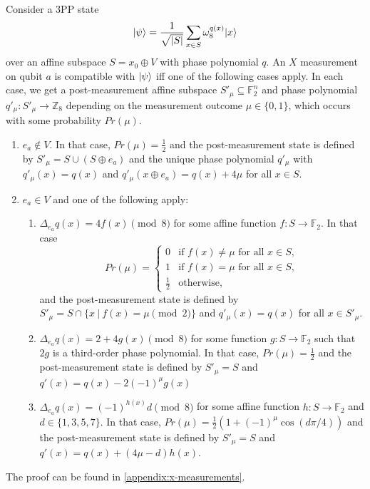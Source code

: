 \newcommand{\xMeasurementClassificationStatement}{%
    Consider a 3PP state
    \[ \ket{\psi} = \frac{1}{\sqrt{|S|}} \sum_{x\in S} \omega_8^{q(x)}\ket{x} \]
    over an affine subspace $S = x_0 \oplus V$ with phase polynomial $q$.
    An $X$ measurement on qubit $a$ is compatible with $\ket{\psi}$ iff one of the following cases apply.
    In each case, we get a post-measurement affine subspace $S'_\mu \subseteq \mathbb F_2^n$ and phase polynomial $q'_\mu: S'_\mu \to \mathbb Z_8$ depending on the measurement outcome $\mu \in \{0, 1\}$, which occurs with some probability $Pr(\mu)$.
    \begin{enumerate}
        \item $e_a \not\in V$. In that case, $Pr(\mu) = \frac{1}{2}$ and the post-measurement state is defined by $S'_\mu = S \cup (S \oplus e_a)$ and the unique phase polynomial $q'_\mu$ with $q'_\mu(x) = q(x)$ and $q'_\mu(x \oplus e_a) = q(x) + 4\mu$ for all $x \in S$.

        \item
        $e_a \in V$ and one of the following apply:
        \begin{enumerate}
            \item \label{thm:x-measurements:even-0-4}
            $\Delta_{e_a} q(x) = 4f(x) \pmod 8$ for some affine function $f: S \to \mathbb F_2$. In that case
            \[
                Pr(\mu) = \begin{cases}
                    0 & \text{if } f(x) \neq \mu \text{ for all } x \in S, \\
                    1 & \text{if } f(x) = \mu \text{ for all } x \in S, \\
                    \frac{1}{2} & \text{otherwise},
                \end{cases}
            \]
            and the post-measurement state is defined by $S'_\mu = S \cap \{ x ~|~ f(x) = \mu \pmod 2 \}$ and $q'_\mu(x) = q(x)$ for all $x \in S'_\mu$.

            \item \label{thm:x-measurements:even-2-6}
            $\Delta_{e_a} q(x) = 2 + 4g(x) \pmod 8$ for some function $g: S \to \mathbb F_2$ such that $2g$ is a third-order phase polynomial.
            In that case, $Pr(\mu) = \frac{1}{2}$ and the post-measurement state is defined by $S'_\mu = S$ and $q'(x) = q(x) - 2(-1)^\mu g(x)$

            \item \label{thm:x-measurements:odd}
            $\Delta_{e_a} q(x) = (-1)^{h(x)}d \pmod 8$ for some affine function $h: S \to \mathbb F_2$ and $d \in \{ 1, 3, 5, 7 \}$.
            In that case, $Pr(\mu) = \frac{1}{2}(1 + (-1)^\mu\cos(d\pi/4))$ and the post-measurement state is defined by $S'_\mu = S$ and $q'(x) = q(x) + (4\mu - d)h(x)$.
        \end{enumerate}
    \end{enumerate}
}
\begin{theorem}\label{thm:x-measurements}
    \xMeasurementClassificationStatement
\end{theorem}
The proof can be found in \cref{appendix:x-measurements}.

